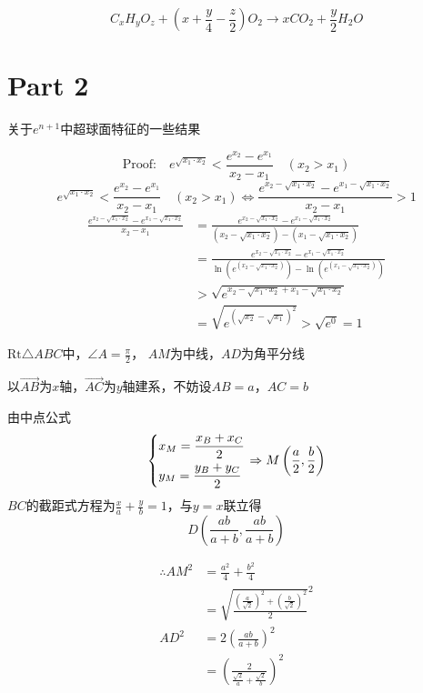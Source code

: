 \documentclass[UTF8]{article}
\begin{document}
$$
{C_xH_yO_z +(x +\frac y4-\frac z2)O_2\rightarrow xCO_2+\frac y2H_2O}
$$


\section{Part 2}
关于$e^{n+1}$中超球面特征的一些结果 \cite{Wen}

$$
\text{Proof:}\quad{e^{\sqrt {{x_1} \cdot {x_2}} }} < \frac{{{e^{{x_2}}} - {e^{{x_1}}}}}{{{x_2} - {x_1}}}
\quad({x_2} > {x_1})$$
$$
{e^{\sqrt {{x_1} \cdot {x_2}} }} < \frac{{{e^{{x_2}}} - {e^{{x_1}}}}}{{{x_2} - {x_1}}}
\quad({x_2} > {x_1})
\Leftrightarrow 
\frac{{{e^{{x_2} - \sqrt {{x_1} \cdot {x_2}} }} - {e^{{x_1} - \sqrt {{x_1} \cdot {x_2}} }}}}{{{x_2} - {x_1}}} > 1
$$
$$\begin{aligned}
\frac{{{e^{{x_2} - \sqrt {{x_1} \cdot {x_2}} }} - {e^{{x_1} - \sqrt {{x_1} \cdot {x_2}} }}}}{{{x_2} - {x_1}}}&=\frac{{{e^{{x_2} - \sqrt {{x_1} \cdot {x_2}} }} - {e^{{x_1} - \sqrt {{x_1} \cdot {x_2}} }}}}{{({x_2} - \sqrt {{x_1} \cdot {x_2}} ) - ({x_1} - \sqrt {{x_1} \cdot {x_2}} )}}\\
&=\frac{{{e^{{x_2} - \sqrt {{x_1} \cdot {x_2}} }} - {e^{{x_1} - \sqrt {{x_1} \cdot {x_2}} }}}}{{\ln ({e^{({x_2} - \sqrt {{x_1} \cdot {x_2}} )}}) - \ln ({e^{({x_1} - \sqrt {{x_1} \cdot {x_2}} )}})}}\\
&>\sqrt {{e^{{x_2} - \sqrt {{x_1} \cdot {x_2}}  + {x_1} - \sqrt {{x_1} \cdot {x_2}} }}}\\
&=\sqrt {{e^{{{(\sqrt {{x_2}}  - \sqrt {{x_1}} )}^2}}}}>\sqrt {e^0}=1
\end{aligned}
$$

$\text{Rt}\triangle ABC$中，$\angle A=\frac\pi2$， $AM$为中线，$AD$为角平分线

以$\vec{AB}$为$x$轴，$\vec{AC}$为$y$轴建系，不妨设$AB=a$，$AC=b$

由中点公式
$$
\left\{ \begin{gathered}
  {x_M} = \frac{{{x_B} + {x_C}}}{2} \hfill \\
  {y_M} = \frac{{{y_B} + {y_C}}}{2} \hfill \\\end{gathered}  \right.\Rightarrow M\left( {\frac{a}{2},\frac{b}{2}} \right)
$$
$ BC$的截距式方程为$\frac{x}{a} + \frac{y}{b} = 1$，与$y=x$联立得
$$
D\left( {\frac{{ab}}{{a + b}},\frac{{ab}}{{a + b}}} \right)
$$

$$
\begin{aligned}
\therefore A{M^2} &= \frac{{{a^2}}}{4} + \frac{{{b^2}}}{4}\\
	&={\sqrt {\frac{{{{\left( {\frac{a}{{\sqrt 2 }}} \right)}^2} + {{\left( {\frac{b}{{\sqrt 2 }}} \right)}^2}}}{2}} ^2}
\\AD^2&=2{\left( {\frac{{ab}}{{a + b}}} \right)^2}\\
&= {\left( {\frac{2}{{\frac{{\sqrt 2 }}{a} + \frac{{\sqrt 2 }}{b}}}} \right)^2}
\end{aligned}
$$
\end{document}
